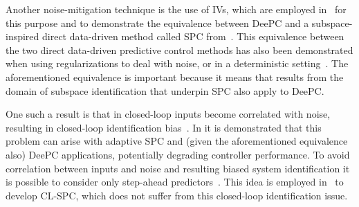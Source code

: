Another noise-mitigation technique is the use of \ac{IVs}, which are employed in~\citep{vanWingerden2022} for this purpose and to demonstrate the equivalence between \ac{DeePC} and a subspace-inspired direct data-driven method called \ac{SPC} from~\cite{Favoreel1999}. This equivalence between the two direct data-driven predictive control methods has  also been demonstrated when using regularizations to deal with noise, or in a deterministic setting~\citep{Fiedler2021}. The aforementioned equivalence is important because it means that results from the domain of subspace identification that underpin \ac{SPC} also apply to \ac{DeePC}.
% 

One such a result is that in closed-loop inputs become correlated with noise, resulting in closed-loop identification bias~\citep{Soderstrom1989a}. In \cite{Dinkla2023} it is demonstrated that this problem can arise with adaptive \ac{SPC} and (given the aforementioned equivalence also) \ac{DeePC} applications, potentially degrading controller performance. %
To avoid correlation between inputs and noise and resulting biased system identification it is possible to consider only step-ahead predictors~\citep{Ljung1996}. This idea is employed in~\cite{Dong2008} to develop \ac{CL-SPC}, which does not suffer from this closed-loop identification issue.

